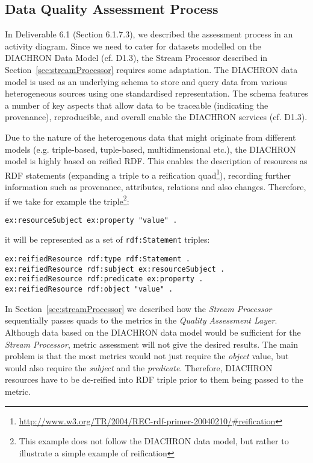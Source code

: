 
\subsection{Data Quality Assessment Process}
\label{sec:DQAssessment} 
In Deliverable 6.1 (Section 6.1.7.3), we described the assessment process in an activity diagram.
Since we need to cater for datasets modelled on the DIACHRON Data Model (cf. D1.3), the Stream Processor described in Section~\ref{sec:streamProcessor} requires some adaptation.
The DIACHRON data model is used as an underlying schema to store and query data from various heterogeneous sources using one standardised representation.
The schema features a number of key aspects that allow data to be traceable (indicating the provenance), reproducible, and overall enable the DIACHRON services (cf. D1.3).

Due to the nature of the heterogenous data that might originate from different models (e.g. triple-based, tuple-based, multidimensional etc.), the DIACHRON model is highly based on reified RDF.
This enables the description of resources as RDF statements (expanding a triple to a reification quad\footnote{\url{http://www.w3.org/TR/2004/REC-rdf-primer-20040210/#reification}}), recording further information such as provenance, attributes, relations and also changes.
Therefore, if we take for example the triple\footnote{This example does not follow the DIACHRON data model, but rather to illustrate a simple example of reification}:
\begin{lstlisting}[language=N3]
ex:resourceSubject ex:property "value" .
\end{lstlisting}
it will be represented as a set of \texttt{rdf:Statement} triples:
\begin{lstlisting}[language=N3]
ex:reifiedResource rdf:type rdf:Statement .
ex:reifiedResource rdf:subject ex:resourceSubject .
ex:reifiedResource rdf:predicate ex:property .
ex:reifiedResource rdf:object "value" .
\end{lstlisting}

In Section~\ref{sec:streamProcessor} we described how the \emph{Stream Processor} sequentially passes quads to the metrics in the \emph{Quality Assessment Layer}.
Although data based on the DIACHRON data model would be sufficient for the \emph{Stream Processor}, metric assessment will not give the desired results.
The main problem is that the most metrics would not just require the \emph{object} value, but would also require the \emph{subject} and the \emph{predicate}.
Therefore, DIACHRON resources have to be de-reified into RDF triple prior to them being passed to the metric.





